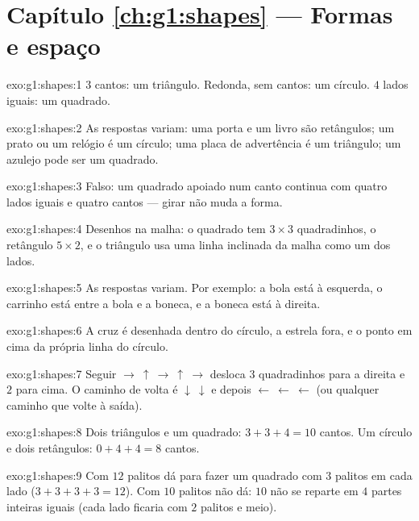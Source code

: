 \section*{Capítulo \ref{ch:g1:shapes} --- Formas e espaço}

\begin{solution}{exo:g1:shapes:1}
$3$ cantos: um triângulo. Redonda, sem cantos: um círculo. $4$ lados
iguais: um quadrado.
\end{solution}

\begin{solution}{exo:g1:shapes:2}
As respostas variam: uma porta e um livro são retângulos; um prato
ou um relógio é um círculo; uma placa de advertência é um triângulo;
um azulejo pode ser um quadrado.
\end{solution}

\begin{solution}{exo:g1:shapes:3}
Falso: um quadrado apoiado num canto continua com quatro lados
iguais e quatro cantos --- girar não muda a forma.
\end{solution}

\begin{solution}{exo:g1:shapes:4}
Desenhos na malha: o quadrado tem $3 \times 3$ quadradinhos, o
retângulo $5 \times 2$, e o triângulo usa uma linha inclinada da
malha como um dos lados.
\end{solution}

\begin{solution}{exo:g1:shapes:5}
As respostas variam. Por exemplo: a bola está à esquerda, o carrinho
está entre a bola e a boneca, e a boneca está à direita.
\end{solution}

\begin{solution}{exo:g1:shapes:6}
A cruz é desenhada dentro do círculo, a estrela fora, e o ponto em
cima da própria linha do círculo.
\end{solution}

\begin{solution}{exo:g1:shapes:7}
Seguir $\to\ \uparrow\ \to\ \uparrow\ \to$ desloca $3$ quadradinhos
para a direita e $2$ para cima. O caminho de volta é
$\downarrow\ \downarrow$ e depois
$\leftarrow\ \leftarrow\ \leftarrow$ (ou qualquer caminho que volte
à saída).
\end{solution}

\begin{solution}{exo:g1:shapes:8}
Dois triângulos e um quadrado: $3 + 3 + 4 = 10$ cantos. Um círculo e
dois retângulos: $0 + 4 + 4 = 8$ cantos.
\end{solution}

\begin{solution}{exo:g1:shapes:9}
Com $12$ palitos dá para fazer um quadrado com $3$ palitos em cada
lado ($3 + 3 + 3 + 3 = 12$). Com $10$ palitos não dá: $10$ não se
reparte em $4$ partes inteiras iguais (cada lado ficaria com $2$
palitos e meio).
\end{solution}
